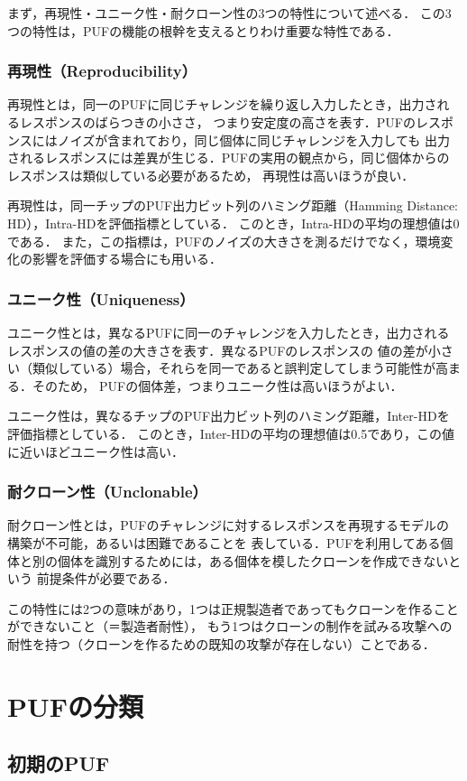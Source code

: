 \documentclass[technicalreport]{ieicej} %
\begin{document}
まず，再現性・ユニーク性・耐クローン性の3つの特性について述べる．
この3つの特性は，PUFの機能の根幹を支えるとりわけ重要な特性である．
\subsubsection{再現性（Reproducibility）}
再現性とは，同一のPUFに同じチャレンジを繰り返し入力したとき，出力されるレスポンスのばらつきの小ささ，
つまり安定度の高さを表す．PUFのレスポンスにはノイズが含まれており，同じ個体に同じチャレンジを入力しても
出力されるレスポンスには差異が生じる．PUFの実用の観点から，同じ個体からのレスポンスは類似している必要があるため，
再現性は高いほうが良い．

再現性は，同一チップのPUF出力ビット列のハミング距離（Hamming Distance: HD），Intra-HDを評価指標としている．
このとき，Intra-HDの平均の理想値は0である．
また，この指標は，PUFのノイズの大きさを測るだけでなく，環境変化の影響を評価する場合にも用いる．
\subsubsection{ユニーク性（Uniqueness）}
ユニーク性とは，異なるPUFに同一のチャレンジを入力したとき，出力されるレスポンスの値の差の大きさを表す．異なるPUFのレスポンスの
値の差が小さい（類似している）場合，それらを同一であると誤判定してしまう可能性が高まる．そのため，
PUFの個体差，つまりユニーク性は高いほうがよい．

ユニーク性は，異なるチップのPUF出力ビット列のハミング距離，Inter-HDを評価指標としている．
このとき，Inter-HDの平均の理想値は0.5であり，この値に近いほどユニーク性は高い．
\subsubsection{耐クローン性（Unclonable）}
耐クローン性とは，PUFのチャレンジに対するレスポンスを再現するモデルの構築が不可能，あるいは困難であることを
表している．PUFを利用してある個体と別の個体を識別するためには，ある個体を模したクローンを作成できないという
前提条件が必要である．

この特性には2つの意味があり，1つは正規製造者であってもクローンを作ることができないこと（＝製造者耐性），
もう1つはクローンの制作を試みる攻撃への耐性を持つ（クローンを作るための既知の攻撃が存在しない）ことである．


\section{PUFの分類}
\subsection{初期のPUF}
\end{document}
